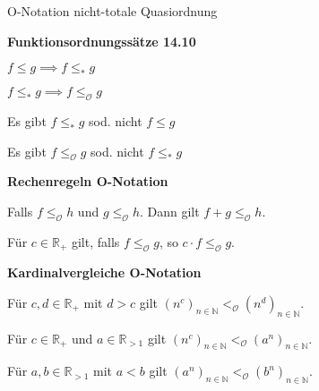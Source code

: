 \documentclass[a4paper,10pt]{article}
\newcommand{\natnum}{\mathbb{N}}
\newcommand{\realnum}{\mathbb{R}}
\newcommand{\lt}{<}
\newcommand{\gt}{>}
\newcommand{\bigOSymbol}{\mathcal{O}}
\begin{document}
\begin{multicols}{3}
O-Notation nicht-totale Quasiordnung

\textbf{Funktionsordnungssätze 14.10}

$f \leq g \implies f \leq_* g$

$f \leq_* g \implies f \leq_{\bigOSymbol} g$

Es gibt $f \leq_* g$ sod. nicht $f \leq g$

Es gibt $f \leq_{\bigOSymbol} g$ sod. nicht $f \leq_* g$

\textbf{Rechenregeln O-Notation}

Falls $f \leq_{\bigOSymbol} h$ und $g \leq_{\bigOSymbol} h$. Dann gilt $f+g \leq_{\bigOSymbol} h$.

Für $c \in \realnum_+$ gilt, falls $f \leq_{\bigOSymbol} g$, so $c \cdot f \leq_{\bigOSymbol} g$.

\textbf{Kardinalvergleiche O-Notation}

Für $c,d \in \realnum_+$ mit $d \gt c$ gilt $\left(n^c\right)_{n \in \natnum} \lt_{\bigOSymbol} \left(n^d\right)_{n \in \natnum}$.

Für $c \in \realnum_+$ und $a \in \realnum_{\gt 1}$ gilt $\left(n^c\right)_{n \in \natnum} \lt_{\bigOSymbol} \left(a^n\right)_{n \in \natnum}$.

Für $a,b \in \realnum_{\gt 1}$ mit $a \lt b$ gilt $\left(a^n\right)_{n \in \natnum} \lt_{\bigOSymbol} \left(b^n\right)_{n \in \natnum}$.

\end{multicols}
\end{document}
